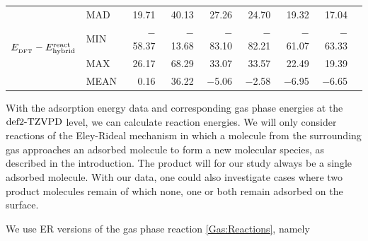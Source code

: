 \documentclass[8.5pt,twoside,twocolumn]{article}
\newcommand\zpe{\enmat{\te{ZPE}}}
\newcommand\dft{\enmat{_{\te{DFT}}}}
\newcommand\gas{\enmat{_\te{(g)}}}
\newcommand{\fakefna}{\enmat{^a}}
\newcommand\kmo{\enmat{\te {kJ/mol}}}
\theoremstyle{standard}
\begin{document}
\begin{table}[htb]
\begin{tabular}{lll|rrrrrr|r}
    \hline \hline
\multicolumn{2}{r|}{\multirow{4}{*}{$E_{\dft} - \erehyb$}} &
                            MAD   & 19.71 & 40.13 & 27.26 & 24.70 & 19.32 & 17.04 &  \\
    \multicolumn{2}{r|}{} &  MIN   & $-$58.37 & $-$13.68 & $-$83.10 & $-$82.21 & $-$61.07 & $-$63.33 &  \\
    \multicolumn{2}{r|}{} &  MAX   & 26.17 & 68.29 & 33.07 & 33.57 & 22.49 & 19.39 &  \\
    \multicolumn{2}{r|}{} &  MEAN  & 0.16  & 36.22 & $-$5.06 & $-$2.58 & $-$6.95 & $-$6.65 &  \\[5pt]
%
%
    \end{tabular}%
  \label{Tab:Ads:React}%
\end{table}%


With the adsorption energy data and corresponding gas phase energies at the
$\text{def2-TZVPD}$ level, we can calculate reaction energies. We will only
consider reactions of the Eley-Rideal mechanism in which a molecule
from the surrounding gas approaches an adsorbed molecule to form
a new molecular species, as described in the introduction.
The product will for our study always be a single adsorbed molecule. With our data,
one could also investigate cases where two product molecules remain
of which none, one or both remain adsorbed on the surface.

We use ER versions of the gas phase reaction \eqref{Gas:Reactions}, namely
\end{document}

